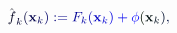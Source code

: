 \documentclass[12pt]{article}
\begin{document}
\makeatletter
\renewcommand*{\@textcolor}[3]{%
  \protect\leavevmode
  \begingroup
    \color#1{#2}#3%
  \endgroup
}
\makeatother
\begin{displaymath}
{\mathcolor[RGB]{0,0,15}{\hat { \mathcolor[RGB]{0,0,30}{f} } }} _ { \mathcolor[RGB]{0,0,45}{k} } \mathcolor[RGB]{0,0,60}{(} { \mathbf { \mathcolor[RGB]{0,0,75}{x} } } _ { \mathcolor[RGB]{0,0,90}{k} } \mathcolor[RGB]{0,0,105}{)} \mathcolor[RGB]{0,0,120}{:} \mathcolor[RGB]{0,0,135}{=} \mathcolor[RGB]{0,0,150}{F} _ { \mathcolor[RGB]{0,0,165}{k} } \mathcolor[RGB]{0,0,180}{(} { \mathbf { \mathcolor[RGB]{0,0,195}{x} } } _ { \mathcolor[RGB]{0,0,210}{k} } \mathcolor[RGB]{0,0,225}{)} \mathcolor[RGB]{0,0,240}{+} \mathcolor[RGB]{0,0,255}{\phi} \mathcolor[RGB]{0,15,0}{(} { \mathbf { \mathcolor[RGB]{0,15,15}{x} } } _ { \mathcolor[RGB]{0,15,30}{k} } \mathcolor[RGB]{0,15,45}{)} \mathcolor[RGB]{0,15,60}{,}
\end{displaymath}
\end{document}
